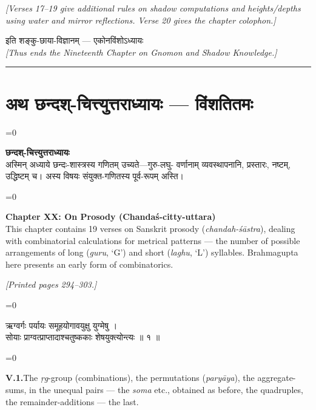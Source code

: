 \documentclass[11pt,a4paper]{article}
\newcommand{\longline}{\noindent\rule{\textwidth}{0.4pt}}
\newcommand{\cnote}[1]{\textcolor{notecolor}{\textit{#1}}}
\newcommand{\dev}[1]{{\devanagarifont\color{sktcolor}#1}}
\newcommand{\dsec}[1]{\section*{\dev{#1}}}
\newcommand{\iast}[1]{\textit{#1}}
\newenvironment{paracol}[1]{\begingroup}{\endgroup}
\newcommand{\switchcolumn}[1][]{%
  \ifnum#1=0\relax\else\par\nobreak\vspace{0.5em}\par\nobreak\fi%
}
\begin{document}
\vspace{0.5cm}
\cnote{[Verses 17–19 give additional rules on shadow computations and
heights/depths using water and mirror reflections. Verse 20 gives
the chapter colophon.]}
\vspace{0.5cm}

\begin{center}
\dev{इति शङ्कु-छाया-विज्ञानम् — एकोनविंशोऽध्यायः}\\[0.3cm]
\textit{[Thus ends the Nineteenth Chapter on Gnomon and Shadow Knowledge.]}
\end{center}

\longline
\newpage

\dsec{अथ छन्दश्-चित्त्युत्तराध्यायः — विंशतितमः}

\begin{paracol}{2}
\switchcolumn[0]
\dev{%
\textbf{छन्दश्-चित्त्युत्तराध्यायः}\\[0.2cm]
अस्मिन् अध्याये छन्दः-शास्त्रस्य गणितम् उच्यते—गुरु-लघु-
वर्णानाम् व्यवस्थापनानि, प्रस्तारः, नष्टम्, उद्धिष्टम् च।
अस्य विषयः संयुक्त-गणितस्य पूर्व-रूपम् अस्ति।
}

\switchcolumn[1]
\textbf{Chapter XX: On Prosody (Chandaś-citty-uttara)}\\[0.2cm]
This chapter contains 19 verses on Sanskrit prosody
(\iast{chandah-śāstra}), dealing with combinatorial calculations
for metrical patterns — the number of possible arrangements of
long (\iast{guru}, `G') and short (\iast{laghu}, `L') syllables.
Brahmagupta here presents an early form of combinatorics.
\end{paracol}

\vspace{0.3cm}
\cnote{[Printed pages 294–303.]}
\vspace{0.3cm}

\begin{paracol}{2}
\switchcolumn[0]
\dev{%
ऋग्वर्गः पर्यायः समूहयोगावयुक्षु युग्मेषु ।\\
सोयाः प्राग्वत्प्राप्तादाश्चतुष्ककाः शेषयुक्त्योन्त्यः ॥ १ ॥
}

\switchcolumn[1]
\textbf{V.1.}\quad The \iast{ṛg}-group (combinations), the
permutations (\iast{paryāya}), the aggregate-sums, in the
unequal pairs — the \iast{soma} etc., obtained as before, the
quadruples, the remainder-additions — the last.
\end{paracol}
\end{document}
